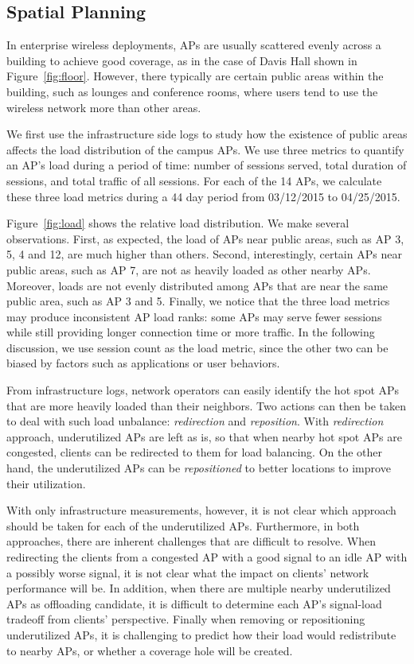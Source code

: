 \subsection{Spatial Planning}
\label{subsec:spatial}

In enterprise wireless deployments, APs are usually scattered evenly across a building
to achieve good coverage, as in the case of Davis Hall shown in
Figure~\ref{fig:floor}. However, there typically are certain public areas within
the building, such as lounges and conference rooms, where users tend to use the
wireless network more than other areas.

We first use the infrastructure side logs to study how the existence of public
areas affects the load distribution of the campus APs. We use three metrics to
quantify an AP's load during a period of time: number of \wifi{} sessions
served, total duration of \wifi{} sessions, and total traffic of all sessions.
For each of the 14 APs, we calculate these three load metrics during a 44 day
period from 03/12/2015 to 04/25/2015.

Figure~\ref{fig:load} shows the relative load distribution. We make several
observations. First, as expected, the load of APs near public areas, such as AP
3, 5, 4 and 12, are much higher than others. Second, interestingly, certain APs
near public areas, such as AP 7, are not as heavily loaded as other nearby APs.
Moreover, loads are not evenly distributed among APs that are near the same
public area, such as AP 3 and 5. Finally, we notice that the three load metrics may
produce inconsistent AP load ranks: some APs may serve fewer \wifi{} sessions
while still providing longer connection time or more traffic. In the following discussion, we
use session count as the load metric, since the other two can be biased by
factors such as applications or user behaviors.

From infrastructure logs, network operators can easily identify the hot
spot APs that are more heavily loaded than their neighbors. Two actions can then
be taken to deal with such load unbalance: \textit{redirection} and
\textit{reposition}. With \textit{redirection} approach, underutilized APs are
left as is, so that when nearby hot spot APs are congested, clients can be
redirected to them for load balancing. On the other hand, the underutilized APs can
be \textit{repositioned} to better locations to improve their
utilization.

With only infrastructure measurements, however, it is not clear which approach
should be taken for each of the underutilized APs. Furthermore, in both
approaches, there are inherent challenges that are difficult to resolve.  When
redirecting the clients from a congested AP with a good signal to an idle AP with
a possibly worse signal, it is not clear what the impact on clients' network
performance will be. In addition, when there are multiple nearby underutilized APs as
offloading candidate, it is difficult to determine each AP's signal-load
tradeoff from clients' perspective. Finally when removing or repositioning
underutilized APs, it is challenging to predict how their load would
redistribute to nearby APs, or whether a coverage hole will be created.

